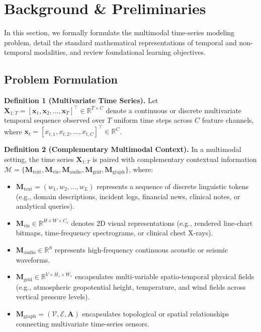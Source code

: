 \section{Background \& Preliminaries}
\label{sec:background}

In this section, we formally formulate the multimodal time-series modeling problem, detail the standard mathematical representations of temporal and non-temporal modalities, and review foundational learning objectives.

\subsection{Problem Formulation}

\textbf{Definition 1 (Multivariate Time Series).} Let $\mathbf{X}_{1:T} = [\mathbf{x}_1, \mathbf{x}_2, \dots, \mathbf{x}_T]^\top \in \mathbb{R}^{T \times C}$ denote a continuous or discrete multivariate temporal sequence observed over $T$ uniform time steps across $C$ feature channels, where $\mathbf{x}_t = [x_{t,1}, x_{t,2}, \dots, x_{t,C}]^\top \in \mathbb{R}^C$.

\textbf{Definition 2 (Complementary Multimodal Context).} In a multimodal setting, the time series $\mathbf{X}_{1:T}$ is paired with complementary contextual information $\mathcal{M} = \{\mathbf{M}_{\text{text}}, \mathbf{M}_{\text{vis}}, \mathbf{M}_{\text{audio}}, \mathbf{M}_{\text{grid}}, \mathbf{M}_{\text{graph}}\}$, where:
\begin{itemize}
    \item $\mathbf{M}_{\text{text}} = (w_1, w_2, \dots, w_L)$ represents a sequence of discrete linguistic tokens (e.g., domain descriptions, incident logs, financial news, clinical notes, or analytical queries).
    \item $\mathbf{M}_{\text{vis}} \in \mathbb{R}^{H \times W \times C_v}$ denotes 2D visual representations (e.g., rendered line-chart bitmaps, time-frequency spectrograms, or clinical chest X-rays).
    \item $\mathbf{M}_{\text{audio}} \in \mathbb{R}^{S}$ represents high-frequency continuous acoustic or seismic waveforms.
    \item $\mathbf{M}_{\text{grid}} \in \mathbb{R}^{V \times H_s \times W_s}$ encapsulates multi-variable spatio-temporal physical fields (e.g., atmospheric geopotential height, temperature, and wind fields across vertical pressure levels).
    \item $\mathbf{M}_{\text{graph}} = (\mathcal{V}, \mathcal{E}, \mathbf{A})$ encapsulates topological or spatial relationships connecting multivariate time-series sensors.
\end{itemize}

